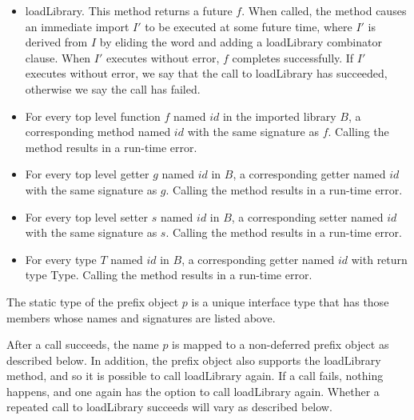 \documentclass{article}
\newcommand{\code}[1]{{\sf #1}}
\begin{document}
\begin{itemize}
\item \code{loadLibrary}. This method returns a future $f$. When called, the method causes an immediate import $I'$ to be executed at some future time, where $I'$ is derived from $I$ by eliding the word \DEFERRED{} and adding a \HIDE{} \code{loadLibrary}  combinator clause. When $I'$ executes without error, $f$ completes successfully. If $I'$ executes without error, we say that the call to \code{loadLibrary} has succeeded, otherwise we say the call has failed.
\item  For every top level function $f$ named $id$ in the imported library $B$, a corresponding method named $id$ with the same signature as $f$. Calling the method results in a run-time error.
\item For every top level getter $g$ named $id$ in $B$, a corresponding getter named $id$ with the same signature as $g$.  Calling the method results in a run-time error.
\item For every top level setter $s$ named $id$ in $B$, a corresponding setter named $id$ with the same signature as $s$.  Calling the method results in a run-time error.
\item For every type $T$ named $id$ in $B$, a corresponding getter named $id$ with return type \code{Type}.  Calling the method results in a run-time error.
\end{itemize}


The static type of the prefix object $p$ is a unique interface type that has those members whose names and signatures are listed above.

\LMHash{}
After a call succeeds, the name $p$ is mapped to a non-deferred prefix object as described below. In addition, the prefix object also supports the \code{loadLibrary} method, and so it is possible to call \code{loadLibrary} again. If a call fails, nothing happens, and one again has the option to call \code{loadLibrary} again. Whether a repeated call to \code{loadLibrary} succeeds will vary as described below.
\end{document}
